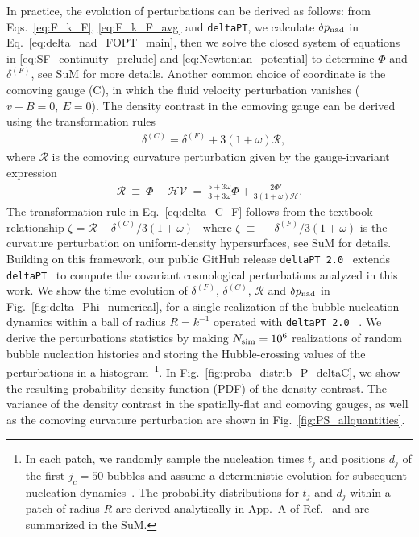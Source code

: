 \documentclass[twocolumn,superscriptaddress,aps,preprintnumbers,amsmath,amssymb,prl,footinbib]{revtex4-2}
\newcommand{\deltaPT}{{\texttt{deltaPT}}}
\newcommand{\deltaPTvTwo}{\texttt{deltaPT\,2.0}}
\begin{document}
In practice, the evolution of perturbations can be derived as follows: from Eqs.~\eqref{eq:F_k_F}, \eqref{eq:F_k_F_avg} and \deltaPT, we calculate $\delta p_{\rm nad}$ in Eq.~\eqref{eq:delta_nad_FOPT_main}, then we solve the closed system of equations in \eqref{eq:SF_continuity_prelude} and \eqref{eq:Newtonian_potential} to determine $\Phi$ and $\delta^{(F)}$, see SuM for more details. Another common choice of coordinate is the comoving gauge (C), in which the fluid velocity perturbation vanishes ($v + B = 0,~ E=0$).
The density contrast in the comoving gauge can be derived using the transformation rules
\begin{align}
&\delta^{(C)}=\delta^{(F)}+ 3(1+\omega)\mathcal{R},\label{eq:delta_C_F}
\end{align}
where $\mathcal{R}$ is the comoving curvature perturbation given by the gauge-invariant expression~\cite{Bardeen:1980kt}
\begin{align}
\mathcal{R} ~\equiv ~\Phi - \mathcal{H}\mathcal{V} ~=~ \frac{5+3\omega}{3+3\omega} \Phi +\frac{2\Phi'}{3(1+\omega)\mathcal{H}}.
\label{eq:mathcalR_def_main}
\end{align}
{The transformation rule in Eq.~\eqref{eq:delta_C_F}  follows from the textbook relationship $\zeta =\mathcal{R}-\delta^{(C)}/3(1+\omega)$~\cite{Baumann:2022mni} where $\zeta~\equiv~ -\delta^{(F)}/3(1+\omega)$ is the curvature perturbation on uniform-density hypersurfaces, see SuM for details.}  {Building on this framework, our public GitHub release \deltaPTvTwo~\cite{deltaPTv2} extends \deltaPT~\cite{Lewicki:2024ghw} to compute the covariant cosmological perturbations analyzed in this work.}
We show the time evolution of $\delta^{(F)}$, $\delta^{(C)}$, $\mathcal{R}$ and $\delta p_{\rm nad}$ in Fig.~\ref{fig:delta_Phi_numerical}, for a single realization of the bubble nucleation dynamics within a ball of radius $R=k^{-1}$ operated with \deltaPTvTwo~\cite{deltaPTv2} . {We derive the perturbations statistics by making $N_{\rm sim}=10^6$ realizations of random bubble nucleation histories and storing the Hubble-crossing values of the perturbations in a histogram~\footnote{{In each patch, we randomly sample the nucleation times $t_j$ and positions $d_j$ of the first $j_c=50$ bubbles and assume a deterministic evolution for subsequent nucleation dynamics~\cite{Lewicki:2024ghw}. The probability distributions for $t_j$ and $d_j$ within a patch of radius $R$ are derived analytically in App.~A of Ref.~\cite{Lewicki:2024ghw} and are summarized in the SuM.}
}.}
In Fig.~\ref{fig:proba_distrib_P_deltaC}, we show the resulting probability density function (PDF) of the density contrast. The variance of the density contrast in the spatially-flat and comoving gauges, as well as the comoving curvature perturbation are shown in Fig.~\ref{fig:PS_allquantities}.
\end{document}

